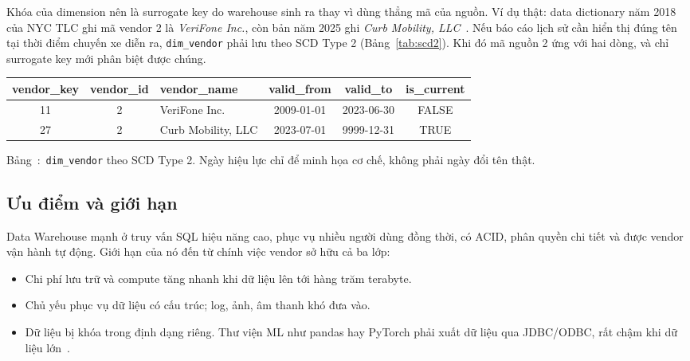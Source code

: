 \documentclass[12pt]{article}
\newenvironment{figblock}{\par\medskip\noindent\begin{minipage}{\linewidth}}{\end{minipage}\par\medskip}
\newcounter{bang}
\newcommand{\tabcap}[2]{%
  \begin{captionbelowboxaivn}\refstepcounter{bang}Bảng~\thebang:~#1\label{#2}\end{captionbelowboxaivn}}
\begin{document}
Khóa của dimension nên là surrogate key do warehouse sinh ra thay vì dùng thẳng mã của nguồn. Ví dụ thật: data dictionary năm 2018 của NYC TLC ghi mã vendor 2 là \textit{VeriFone Inc.}, còn bản năm 2025 ghi \textit{Curb Mobility, LLC}~\cite{tlc2025dictionary}. Nếu báo cáo lịch sử cần hiển thị đúng tên tại thời điểm chuyến xe diễn ra, \texttt{dim\_vendor} phải lưu theo SCD Type 2 (Bảng~\ref{tab:scd2}). Khi đó mã nguồn 2 ứng với hai dòng, và chỉ surrogate key mới phân biệt được chúng.

\begin{figblock}\begin{center}
\renewcommand{\arraystretch}{1.25}
\begin{tabular}{|c|c|l|c|c|c|}
\hline
\rowcolor{rowLavender}
\textbf{vendor\_key} & \textbf{vendor\_id} & \textbf{vendor\_name} & \textbf{valid\_from} & \textbf{valid\_to} & \textbf{is\_current} \\
\hline
11 & 2 & VeriFone Inc. & 2009-01-01 & 2023-06-30 & FALSE \\
\hline
27 & 2 & Curb Mobility, LLC & 2023-07-01 & 9999-12-31 & TRUE \\
\hline
\end{tabular}
\end{center}
\tabcap{\texttt{dim\_vendor} theo SCD Type 2. Ngày hiệu lực chỉ để minh họa cơ chế, không phải ngày đổi tên thật.}{tab:scd2}
\end{figblock}

\subsection{Ưu điểm và giới hạn}

Data Warehouse mạnh ở truy vấn SQL hiệu năng cao, phục vụ nhiều người dùng đồng thời, có ACID, phân quyền chi tiết và được vendor vận hành tự động. Giới hạn của nó đến từ chính việc vendor sở hữu cả ba lớp:

\begin{itemize}
    \item Chi phí lưu trữ và compute tăng nhanh khi dữ liệu lên tới hàng trăm terabyte.
    \item Chủ yếu phục vụ dữ liệu có cấu trúc; log, ảnh, âm thanh khó đưa vào.
    \item Dữ liệu bị khóa trong định dạng riêng. Thư viện ML như pandas hay PyTorch phải xuất dữ liệu qua JDBC/ODBC, rất chậm khi dữ liệu lớn~\cite{armbrust2021lakehouse}.
\end{itemize}

\end{document}

